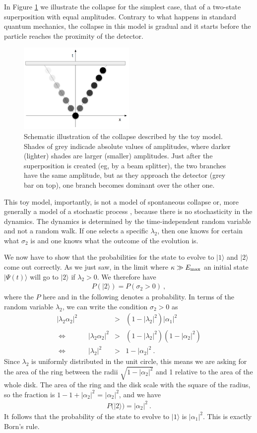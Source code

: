 \documentclass[11pt,twoside,A4]{article}
\def\beqn{\begin{eqnarray}}
\def\eeqn{\end{eqnarray}}
\begin{document}
In Figure \ref{figcollapse} we illustrate the collapse for the simplest case, that of a two-state superposition with equal amplitudes. Contrary to what happens in standard quantum mechanics, the collapse in this model is gradual and it starts before the particle reaches the proximity of the detector. 
\begin{figure}[h]
\centering
\includegraphics[width=0.5\textwidth]{collapse.png}
\caption{Schematic illustration of the collapse described by the toy model. Shades of grey indicade absolute values of amplitudes, where darker (lighter) shades are larger (smaller) amplitudes. Just after the superposition is created (eg, by a beam splitter), the two branches have the same amplitude, but as they approach the detector (grey bar on top), one branch becomes dominant over the other one.}
\label{figcollapse}
\end{figure}
This toy model, importantly, is not a model of spontaneous collapse \cite{Bassi:2003gd} or, more generally a model of a stochastic process \cite{stochastic}, because there is no stochasticity in the dynamics. The dynamics is determined by the time-independent random variable and not a random walk. If one selects a specific $\lambda_2$, then one knows for certain what $\sigma_2$ is and one knows what the outcome of the evolution is. 

We now have to show that the probabilities for the state to evolve to $|1 \rangle$ and $|2 \rangle$ come out correctly. As we just saw, in the limit where $\kappa \gg E_{\rm max}$  an initial state $|\Psi(t) \rangle$ will go to $|2 \rangle$ if $\lambda_2 > 0$. We therefore have
\beqn
P( |2 \rangle ) = P (\sigma_2 > 0)~,
\eeqn
where the $P$ here and in the following denotes a probability.
In terms of the random variable $\lambda_2$, we can write the condition $\sigma_2 > 0$ as
\beqn
| \lambda_2 \alpha_2 |^2 &>& (1 -  | \lambda_2|^2)  |\alpha_1|^2  \nonumber\\
\Leftrightarrow \quad \quad \quad  |  \lambda_2 \alpha_2 |^2 &>& (1 -  |\lambda_2|^2) (1- |\alpha_2|^2 ) \nonumber\\
\Leftrightarrow \quad \quad \quad | \lambda_2|^2 &>& 1- |\alpha_2|^2~. \label{prob}
\eeqn
Since $ \lambda_2$ is uniformly distributed in the unit circle, this means we are asking for the area of the ring between the radii $\sqrt{1- |\alpha_2|^2}$  and 1 relative to
the area of the whole disk. The area of the ring and the disk scale with the square of the radius, so the fraction is $1-1+|\alpha_2|^2$ = $|\alpha_2|^2$, and we have
\beqn
P(|2 \rangle) = |\alpha_2|^2~.
\eeqn
 It follows that the probability of the state to evolve to $|1 \rangle$ is $|\alpha_1|^2$. This is exactly Born's rule. 
 
\end{document}
